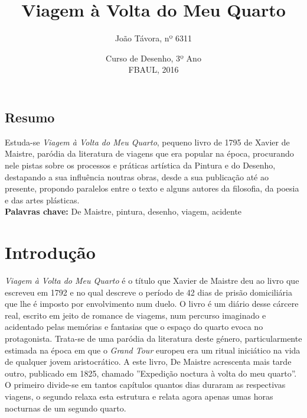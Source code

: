 \documentclass[12pt]{article}
\title{\large{Viagem à Volta do Meu Quarto}}
\author{\vspace*{-3ex}João Távora, nº 6311}
\date{\vspace*{-3ex}Curso de Desenho, 3º Ano\\\vspace*{-1ex}FBAUL, 2016}
\begin{document}

\maketitle

\renewcommand\contentsname{Sumário}
\tableofcontents

\begin{spacing}{1.0}
\begin{small}
  \section{Resumo}

    \noindent Estuda-se \emph{Viagem à Volta do Meu Quarto}, pequeno
    livro de 1795 de Xavier de Maistre, paródia da literatura de
    viagens que era popular na época, procurando nele pistas sobre os
    processos e práticas artística da Pintura e do Desenho, destapando
    a sua influência noutras obras, desde a sua publicação até ao
    presente, propondo paralelos entre o texto e alguns autores da
    filosofia, da poesia e das artes plásticas.\\
    \noindent\textbf{Palavras chave:} De Maistre, pintura, desenho,
    viagem, acidente
    
\end{small}

\end{spacing}
\vspace*{-1ex}

\section{Introdução}

\emph{Viagem à Volta do Meu Quarto} é o título que Xavier de Maistre
deu ao livro que escreveu em 1792 e no qual descreve o período de 42
dias de prisão domiciliária que lhe é imposto por envolvimento num
duelo. O livro é um diário desse cárcere real, escrito em jeito de
romance de viagems, num percurso imaginado e acidentado pelas memórias
e fantasias que o espaço do quarto evoca no protagonista. Trata-se de
uma paródia da literatura deste género, particularmente estimada na
época em que o \emph{Grand Tour} europeu era um ritual iniciático na
vida de qualquer jovem aristocrático. A este livro, De Maistre
acrescenta mais tarde outro, publicado em 1825, chamado ''Expedição
noctura à volta do meu quarto''. O primeiro divide-se em tantos
capítulos quantos dias duraram as respectivas viagens, o segundo
relaxa esta estrutura e relata agora apenas umas horas nocturnas de um
segundo quarto.
\end{document}
